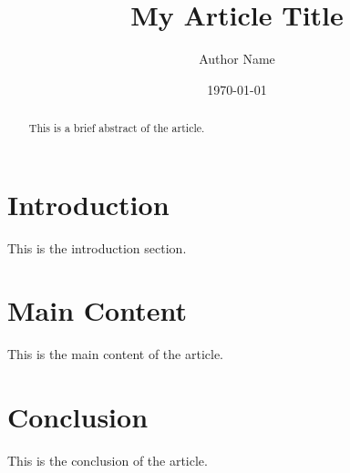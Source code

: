 \documentclass[]{article}
\title{My Article Title}
\author{Author Name}
\date{\today}
\begin{document}
\maketitle

\begin{abstract}
This is a brief abstract of the article.
\end{abstract}

\section{Introduction}
This is the introduction section.

\section{Main Content}
This is the main content of the article.



\section{Conclusion}
This is the conclusion of the article.
\end{document}
